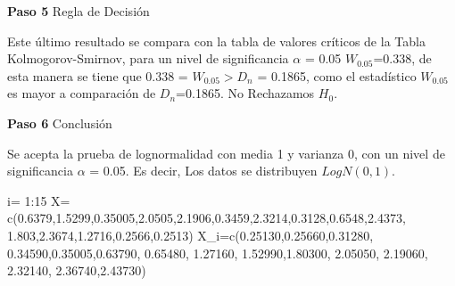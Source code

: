 \documentclass[
  a4paper,
  oneside,
  openany]{book}
\newenvironment{Shaded}{\begin{snugshade}}{\end{snugshade}}
\newcommand{\DecValTok}[1]{\textcolor[rgb]{0.00,0.00,0.81}{#1}}
\newcommand{\FloatTok}[1]{\textcolor[rgb]{0.00,0.00,0.81}{#1}}
\newcommand{\FunctionTok}[1]{\textcolor[rgb]{0.00,0.00,0.00}{#1}}
\newcommand{\NormalTok}[1]{#1}
\newcommand{\OtherTok}[1]{\textcolor[rgb]{0.56,0.35,0.01}{#1}}
\newcommand{\SpecialCharTok}[1]{\textcolor[rgb]{0.00,0.00,0.00}{#1}}
\begin{document}
\textbf{Paso 5} Regla de Decisión

Este último resultado se compara con la tabla de valores críticos de la Tabla Kolmogorov-Smirnov, para un nivel de significancia \(\alpha\) = 0.05
\(W_{0.05}\)=0.338, de esta manera se tiene que 0.338 = \(W_{0.05} > D_{n}\) = 0.1865, como el estadístico \(W_{0.05}\) es mayor a comparación de \(D_{n}\)=0.1865.
No Rechazamos \(H_0\).

\textbf{Paso 6} Conclusión

Se acepta la prueba de lognormalidad con media 1 y varianza 0, con un nivel de significancia \(\alpha\) = 0.05. Es decir, Los datos se distribuyen \(LogN(0,1)\).

\begin{Shaded}
\begin{Highlighting}[]
\NormalTok{i}\OtherTok{=} \DecValTok{1}\SpecialCharTok{:}\DecValTok{15}
\NormalTok{X}\OtherTok{=} \FunctionTok{c}\NormalTok{(}\FloatTok{0.6379}\NormalTok{,}\FloatTok{1.5299}\NormalTok{,}\FloatTok{0.35005}\NormalTok{,}\FloatTok{2.0505}\NormalTok{,}\FloatTok{2.1906}\NormalTok{,}\FloatTok{0.3459}\NormalTok{,}\FloatTok{2.3214}\NormalTok{,}\FloatTok{0.3128}\NormalTok{,}\FloatTok{0.6548}\NormalTok{,}\FloatTok{2.4373}\NormalTok{,}
               \FloatTok{1.803}\NormalTok{,}\FloatTok{2.3674}\NormalTok{,}\FloatTok{1.2716}\NormalTok{,}\FloatTok{0.2566}\NormalTok{,}\FloatTok{0.2513}\NormalTok{)}
\NormalTok{X\_i}\OtherTok{=}\FunctionTok{c}\NormalTok{(}\FloatTok{0.25130}\NormalTok{,}\FloatTok{0.25660}\NormalTok{,}\FloatTok{0.31280}\NormalTok{, }\FloatTok{0.34590}\NormalTok{,}\FloatTok{0.35005}\NormalTok{,}\FloatTok{0.63790}\NormalTok{, }\FloatTok{0.65480}\NormalTok{, }\FloatTok{1.27160}\NormalTok{, }
               \FloatTok{1.52990}\NormalTok{,}\FloatTok{1.80300}\NormalTok{, }\FloatTok{2.05050}\NormalTok{, }\FloatTok{2.19060}\NormalTok{, }\FloatTok{2.32140}\NormalTok{, }\FloatTok{2.36740}\NormalTok{,}\FloatTok{2.43730}\NormalTok{)}


\end{Highlighting}
\end{Shaded}
\end{document}
